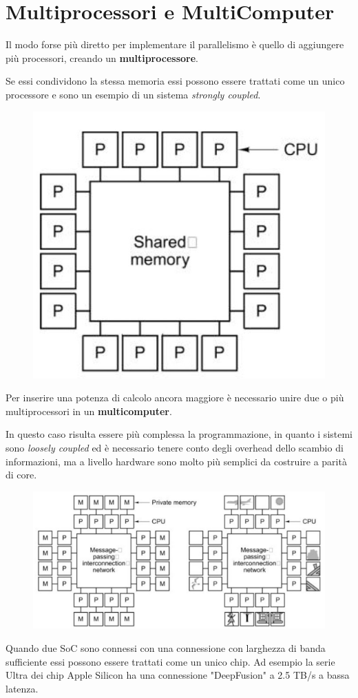 \section{Multiprocessori e MultiComputer}
Il modo forse più diretto per implementare il parallelismo è quello di aggiungere più processori, creando un \textbf{multiprocessore}.

Se essi condividono la stessa memoria essi possono essere trattati come un unico processore e sono un esempio di un sistema \textit{strongly coupled}.

\begin{figure}[H]
    \centering
    \includegraphics[width=0.28\linewidth]{assets/multiprocessore.jpg}
\end{figure}

Per inserire una potenza di calcolo ancora maggiore è necessario unire due o più multiprocessori in un \textbf{multicomputer}.

In questo caso risulta essere più complessa la programmazione, in quanto i sistemi sono \textit{loosely coupled} ed è necessario tenere conto degli overhead dello scambio di informazioni, ma a livello hardware sono molto più semplici da costruire a parità di core.

\begin{figure}[H]
    \centering
    \includegraphics[width=0.62\linewidth]{assets/multicomputer.jpeg}
\end{figure}

\begin{note}
    Quando due SoC sono connessi con una connessione con larghezza di banda sufficiente essi possono essere trattati come un unico chip. Ad esempio la serie Ultra dei chip Apple Silicon ha una connessione "DeepFusion" a 2.5 TB/s a bassa latenza.
\end{note}

